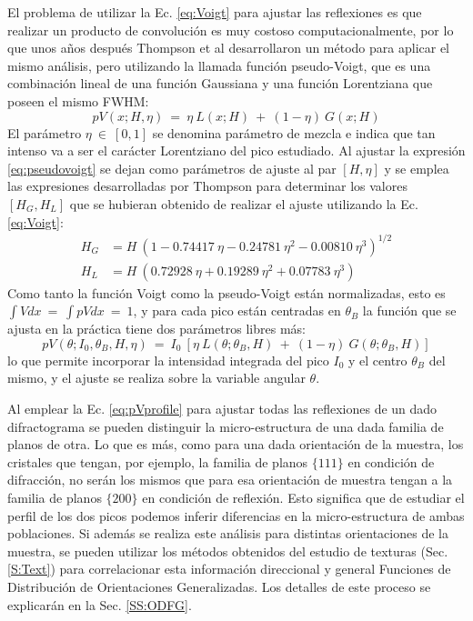 El problema de utilizar la Ec. \ref{eq:Voigt} para ajustar las reflexiones es que realizar un producto de convolución es muy costoso computacionalmente, por lo que unos años después Thompson et al\cite{Thompson1987} desarrollaron un método para aplicar el mismo análisis, pero utilizando la llamada función pseudo-Voigt, que es una combinación lineal de una función Gaussiana y una función Lorentziana que poseen el mismo FWHM:
\begin{equation}
  pV(x; H, \eta) \ = \ \eta \ L(x; H) \ + \ (1 - \eta) \ G(x; H)
  \label{eq:pseudovoigt}
\end{equation}
\noindent
El parámetro $\eta \ \in \ [0,1]$ se denomina parámetro de mezcla e indica que tan intenso va a ser el carácter Lorentziano del pico estudiado. 
Al ajustar la expresión \ref{eq:pseudovoigt} se dejan como parámetros de ajuste al par $[H, \eta]$ y se emplea las expresiones desarrolladas por Thompson para determinar los valores $[H_G, H_L]$ que se hubieran obtenido de realizar el ajuste utilizando la Ec. \ref{eq:Voigt}:
\begin{align}
  H_G & =  H \ (1 -  0.74417 \ \eta - 0.24781 \ \eta^2 - 0.00810 \ \eta^3)^{1/2} \nonumber \\
  H_L & =  H \ (0.72928 \ \eta + 0.19289 \ \eta^2 + 0.07783 \ \eta^3)
  \label{eq:Hg}
\end{align}
\noindent
Como tanto la función Voigt como la pseudo-Voigt están normalizadas, esto es $\int V dx \ = \ \int pV dx \ = \ 1$, y para cada pico están centradas en $\theta_B$ la función que se ajusta en la práctica tiene dos parámetros libres más:
\begin{equation}
    pV(\theta; I_0, \theta_B, H, \eta) \ = \ I_0 \ [\eta \ L(\theta; \theta_B, H) \ + \ (1 - \eta) \ G(\theta; \theta_B, H)]
  \label{eq:pVprofile}
\end{equation}
\noindent
lo que permite incorporar la intensidad integrada del pico $I_0$ y el centro $\theta_B$ del mismo, y el ajuste se realiza sobre la variable angular $\theta$.

Al emplear la Ec. \ref{eq:pVprofile} para ajustar todas las reflexiones de un dado difractograma se pueden distinguir la micro-estructura de una dada familia de planos de otra.
Lo que es más, como para una dada orientación de la muestra, los cristales que tengan, por ejemplo, la familia de planos $\{111\}$ en condición de difracción, no serán los mismos que para esa orientación de muestra tengan a la familia de planos $\{200\}$ en condición de reflexión.
Esto significa que de estudiar el perfil de los dos picos podemos inferir diferencias en la micro-estructura de ambas poblaciones.
Si además se realiza este análisis para distintas orientaciones de la muestra, se pueden utilizar los métodos obtenidos del estudio de texturas (Sec. \ref{S:Text}) para correlacionar esta información direccional y general Funciones de Distribución de Orientaciones Generalizadas.
Los detalles de este proceso se explicarán en la Sec. \ref{SS:ODFG}.

